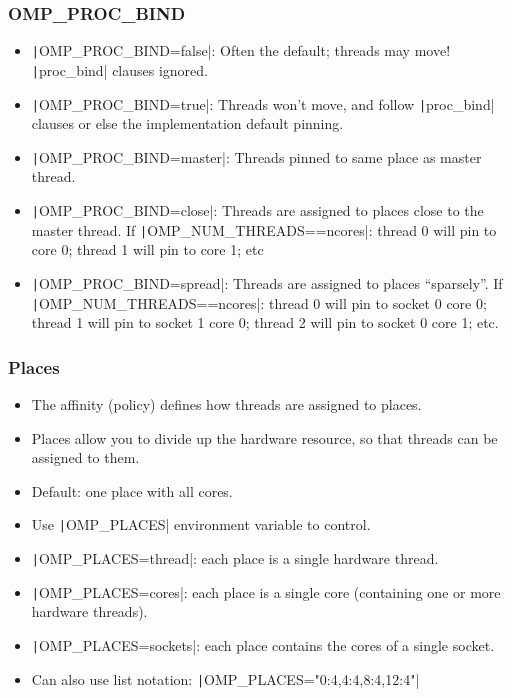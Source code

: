 \documentclass[aspectratio=169]{beamer}
\begin{document}
\begin{frame}
\frametitle{OMP\_PROC\_BIND}
\begin{itemize}
  \item \texttt|OMP_PROC_BIND=false|: Often the default; threads may move! \texttt|proc_bind| clauses ignored.
  \item \texttt|OMP_PROC_BIND=true|: Threads won't move, and follow \texttt|proc_bind| clauses or else the implementation default pinning.
  \item \texttt|OMP_PROC_BIND=master|: Threads pinned to same place as master thread.
  \item \texttt|OMP_PROC_BIND=close|: Threads are assigned to places close to the master thread.
  If \texttt|OMP_NUM_THREADS==ncores|: thread 0 will pin to core 0; thread 1 will pin to core 1; etc
  \item \texttt|OMP_PROC_BIND=spread|: Threads are assigned to places ``sparsely''.
  If \texttt|OMP_NUM_THREADS==ncores|: thread 0 will pin to socket 0 core 0; thread 1 will pin to socket 1 core 0; thread 2 will pin to socket 0 core 1; etc.
\end{itemize}
\end{frame}

\begin{frame}
\frametitle{Places}
\begin{itemize}
  \item The affinity (policy) defines how threads are assigned to places.
  \item Places allow you to divide up the hardware resource, so that threads can be assigned to them.
  \item Default: one place with all cores.
  \item Use \texttt|OMP_PLACES| environment variable to control.
  \item \texttt|OMP_PLACES=thread|: each place is a single hardware thread.
  \item \texttt|OMP_PLACES=cores|: each place is a single core (containing one or more hardware threads).
  \item \texttt|OMP_PLACES=sockets|: each place contains the cores of a single socket.
  \item Can also use list notation: \texttt|OMP_PLACES="{0:4},{4:4},{8:4},{12:4}"|
\end{itemize}
\end{frame}
\end{document}
